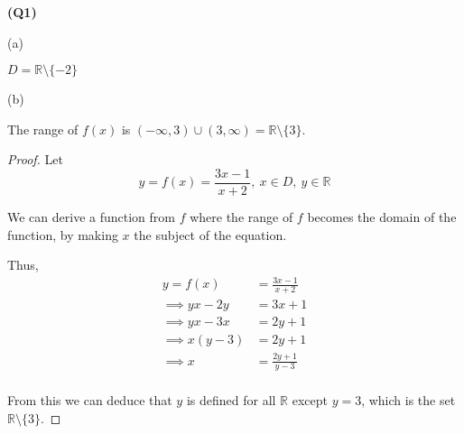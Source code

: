 \documentclass[12pt, a4paper]{article}
\newcommand{\R}{\mathbb{R}}
\newcommand{\open}[2]{\left(#1, #2\right)}
\begin{document}
\noindent\textbf{(Q1)}

\noindent (a)

$D = \R \setminus \{-2\}$

\noindent (b)

The range of $f(x)$ is $\open{-\infty}{3} \cup \open{3}{\infty} = \R \setminus \{3\}$.

\begin{proof}
    Let
    \[
        y = f(x) = \frac{3x - 1}{x + 2},\: x \in D,\:y \in \R
    \]

    We can derive a function from $f$ where the range of $f$ becomes the domain 
    of the function, by making $x$ the subject of the equation.

    Thus,
    \begin{align*}
        y = f(x) & = \frac{3x - 1}{x + 2}\\
        \implies yx - 2y & = 3x + 1\\
        \implies yx - 3x & = 2y + 1\\
        \implies x(y - 3) & = 2y + 1\\
        \implies x & = \frac{2y + 1}{y - 3}\\
    \end{align*}

    From this we can deduce that $y$ is defined for all $\R$ except $y = 3$, which is the
    set $\R \setminus \{3\}$.
\end{proof}
\end{document}
